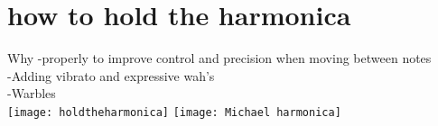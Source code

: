 \newpage
    \section{how to hold the harmonica}
    Why
    -properly to improve control and precision when moving between notes\\
    -Adding vibrato and expressive wah's \\
    -Warbles\\
    \texttt{[image: holdtheharmonica]}
        \texttt{[image: Michael harmonica]}
    \\